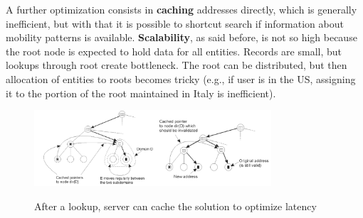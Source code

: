\documentclass[10pt,a4paper]{article}
\begin{document}
A further optimization consists in \textbf{caching} addresses directly, which is generally inefficient, but with that it is possible to shortcut search if information about mobility patterns is available. \textbf{Scalability}, as said before, is not so high because the root node is expected to hold data for all entities. Records are small, but lookups through root create bottleneck. The root can be distributed, but then allocation of entities to roots becomes tricky (e.g., if user is in the US, assigning it to the portion of the root maintained in Italy is inefficient).
\begin{figure}[h!]
 \hfill \includegraphics[width=250pt]{images/hierarchical-opt.png}\hspace*{\fill}
  \label{fig:hierarchical-opt}
  \caption{After a lookup, server can cache the solution to optimize latency}
\end{figure}
\end{document}
